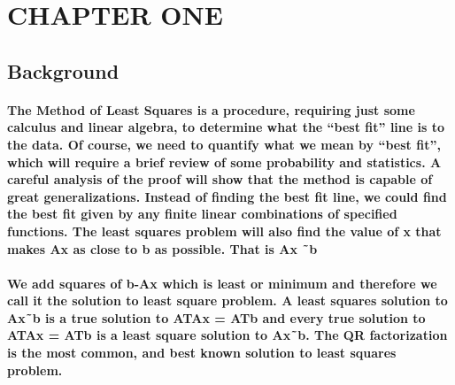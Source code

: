 \documentclass{article}
\begin{document}
\author{KAGGWA HAM 14/U/6759/PS\\ }
\section{CHAPTER ONE}       

\subsection{Background}  
  \paragraph{The Method of Least Squares is a procedure, requiring just some calculus and linear algebra, to determine what the “best fit” line is to the data. Of course, we need to quantify what
we mean by “best fit”, which will require a brief review of some probability and statistics.
A careful analysis of the proof will show that the method is capable of great generalizations. Instead of finding the best fit line, we could find the best fit given by any finite linear
combinations of specified functions. The least squares problem will also find the value of x that makes Ax as close to b as possible. That is Ax ˜b
}
\paragraph{We add squares of b-Ax which is least or minimum and therefore we call it the solution to least square problem.
A least squares solution to Ax˜b is a true solution to ATAx = ATb and every true solution to ATAx = ATb is a least square solution to Ax˜b.
The QR factorization is the most common, and best known solution to least squares problem.
}
\end{document}
